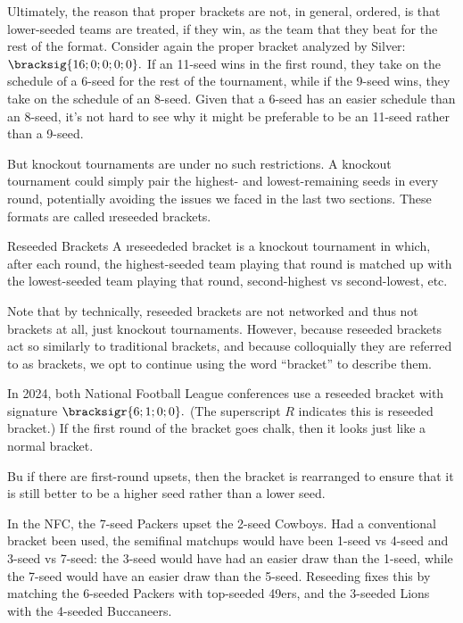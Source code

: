 {    Ultimately, the reason that proper brackets are not, in general, ordered, is that lower-seeded teams are treated, if they win, as the team that they beat for the rest of the format. Consider again the proper bracket analyzed by Silver: $\bracksig{16; 0; 0; 0; 0}.$ If an 11-seed wins in the first round, they take on the schedule of a 6-seed for the rest of the tournament, while if the 9-seed wins, they take on the schedule of an 8-seed. Given that a 6-seed has an easier schedule than an 8-seed, it's not hard to see why it might be preferable to be an 11-seed rather than a 9-seed.

    But knockout tournaments are under no such restrictions. A knockout tournament could simply pair the highest- and lowest-remaining seeds in every round, potentially avoiding the issues we faced in the last two sections. These formats are called \i{reseeded brackets}.

    \begin{definition}{Reseeded Brackets}{}
        A \i{reseededed bracket} is a knockout tournament in which, after each round, the highest-seeded team playing that round is matched up with the lowest-seeded team playing that round, second-highest vs second-lowest, etc.
    \end{definition}

    Note that by technically, reseeded brackets are not networked and thus not brackets at all, just knockout tournaments. However, because reseeded brackets act so similarly to traditional brackets, and because colloquially they are referred to as brackets, we opt to continue using the word ``bracket'' to describe them.

    In 2024, both National Football League conferences use a reseeded bracket with signature $\bracksigr{6; 1; 0; 0}.$ (The superscript $R$ indicates this is reseeded bracket.) If the first round of the bracket goes chalk, then it looks just like a normal bracket.


    Bu if there are first-round upsets, then the bracket is rearranged to ensure that it is still better to be a higher seed rather than a lower seed.


    In the NFC, the 7-seed Packers upset the 2-seed Cowboys. Had a conventional bracket been used, the semifinal matchups would have been 1-seed vs 4-seed and 3-seed vs 7-seed: the 3-seed would have had an easier draw than the 1-seed, while the 7-seed would have an easier draw than the 5-seed. Reseeding fixes this by matching the 6-seeded Packers with top-seeded 49ers, and the 3-seeded Lions with the 4-seeded Buccaneers.

}
